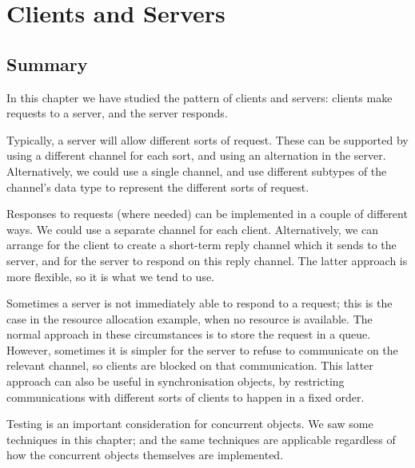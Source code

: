 \chapter{Clients and Servers}





\section{Summary}

In this chapter we have studied the pattern of clients and servers: clients
make requests to a server, and the server responds.  

Typically, a server will allow different sorts of request.  These can be
supported by using a different channel for each sort, and using an alternation
in the server.  Alternatively, we could use a single channel, and use
different subtypes of the channel's data type to represent the different sorts
of request. 

Responses to requests (where needed) can be implemented in a couple of
different ways.  We could use a separate channel for each client.
Alternatively, we can arrange for the client to create a short-term reply
channel which it sends to the server, and for the server to respond on this
reply channel.  The latter approach is more flexible, so it is what we tend to
use. 

Sometimes a server is not immediately able to respond to a request; this is
the case in the resource allocation example, when no resource is available.
The normal approach in these circumstances is to store the request in a queue.
However, sometimes it is simpler for the server to refuse to communicate on
the relevant channel, so clients are blocked on that communication.  This
latter approach can also be useful in synchronisation objects, by restricting
communications with different sorts of clients to happen in a fixed order. 

Testing is an important consideration for concurrent objects.  We saw some
techniques in this chapter; and the same techniques are applicable regardless
of how the concurrent objects themselves are implemented.

